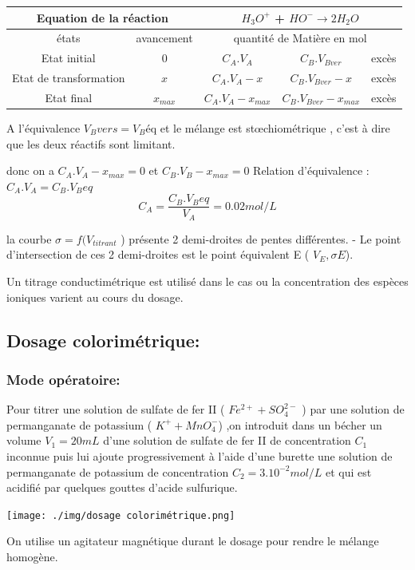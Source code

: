 \documentclass[12pt]{article}
\begin{document}
\begin{center}
\begin{tabular}{|c|c|c|c|c|}
    \hline
    \multicolumn{2}{|c|}{Equation de la réaction}& \multicolumn{3}{c|}{ $H_3O^+$ + $HO^- \rightarrow 2H_2O$}\\\hline
    états  & avancement& \multicolumn{3}{|c|}{quantité de Matière en mol}\\\hline
    Etat initial          & 0 &$C_A.V_A$  &$C_B.V_{Bver}$ & excès  \\\hline
    Etat de transformation&$x$&$C_A.V_A-x$&$C_B.V_{Bver}-x$& excès  \\\hline
    Etat final            &    $x_{max}$& $ C_A.V_A-x_{max}$ & $ C_B.V_{Bver}-x_{max}$&excès   \\\hline
\end{tabular}
\end{center}
A l'équivalence $V_Bvers=V_B$éq et le mélange est stœchiométrique , c'est à dire que les deux réactifs sont limitant.

donc on a  $C_A.V_A - x_{max} = 0 $ et $C_B.V_B - x_{max} = 0 $ Relation d'équivalence : $C_A.V_A = C_B.V_Beq$ 
$$C_A = \frac{C_B.V_Beq}{V_A} = 0.02mol/L$$

\begin{tcolorbox}[colback=pink!10!white,
                  colframe=blue!15!gray,
                  title=Conclusion : 
                 ]
  la courbe  $\sigma= f(V_{titrant}$ ) présente 2 demi-droites de pentes différentes.
  - Le point d’intersection de ces 2 demi-droites est le point équivalent E ( $ V_E, \sigma{E}$).

Un titrage conductimétrique est utilisé dans le cas ou la concentration des espèces ioniques varient au cours du
dosage.

\end{tcolorbox}


\subsection{Dosage colorimétrique:}
\subsubsection{Mode opératoire:}
Pour titrer une solution de sulfate de fer II ( $Fe^{2+} + SO_4^{2-}$ ) par une solution de permanganate de potassium ( $K^+ + MnO_4^- $) ,on introduit dans un bécher un volume $V_1=20mL$ d'une solution de sulfate de fer II de concentration $C_1$ inconnue puis lui ajoute progressivement à l'aide d'une burette une solution de permanganate de potassium de concentration $C_2=3.10^{-2}mol/L$ et qui est acidifié par quelques gouttes d'acide sulfurique. 
\begin{center}
\texttt{[image: ./img/dosage colorimétrique.png]}
\end{center}
On utilise un agitateur magnétique durant le dosage pour rendre le mélange homogène.
\end{document}
